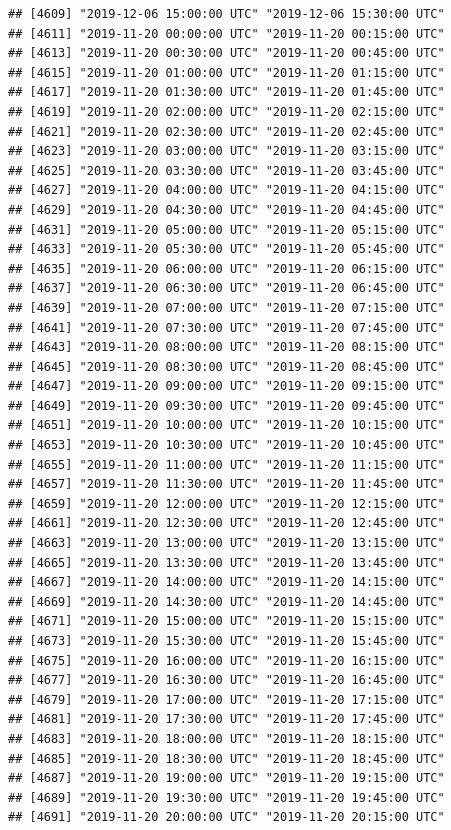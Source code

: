 \documentclass{article}\usepackage[]{graphicx}\usepackage[]{color}
\makeatletter
\newenvironment{kframe}{%
 \def\at@end@of@kframe{}%
 \ifinner\ifhmode%
  \def\at@end@of@kframe{\end{minipage}}%
  \begin{minipage}{\columnwidth}%
 \fi\fi%
 \def\FrameCommand##1{\hskip\@totalleftmargin \hskip-\fboxsep
 \colorbox{shadecolor}{##1}\hskip-\fboxsep
     \hskip-\linewidth \hskip-\@totalleftmargin \hskip\columnwidth}%
 \MakeFramed {\advance\hsize-\width
   \@totalleftmargin\z@ \linewidth\hsize
   \@setminipage}}%
 {\par\unskip\endMakeFramed%
 \at@end@of@kframe}
\newenvironment{knitrout}{}{} %
\makeatother
\begin{document}
\begin{knitrout}
\begin{kframe}
\begin{verbatim}
## [4609] "2019-12-06 15:00:00 UTC" "2019-12-06 15:30:00 UTC"
## [4611] "2019-11-20 00:00:00 UTC" "2019-11-20 00:15:00 UTC"
## [4613] "2019-11-20 00:30:00 UTC" "2019-11-20 00:45:00 UTC"
## [4615] "2019-11-20 01:00:00 UTC" "2019-11-20 01:15:00 UTC"
## [4617] "2019-11-20 01:30:00 UTC" "2019-11-20 01:45:00 UTC"
## [4619] "2019-11-20 02:00:00 UTC" "2019-11-20 02:15:00 UTC"
## [4621] "2019-11-20 02:30:00 UTC" "2019-11-20 02:45:00 UTC"
## [4623] "2019-11-20 03:00:00 UTC" "2019-11-20 03:15:00 UTC"
## [4625] "2019-11-20 03:30:00 UTC" "2019-11-20 03:45:00 UTC"
## [4627] "2019-11-20 04:00:00 UTC" "2019-11-20 04:15:00 UTC"
## [4629] "2019-11-20 04:30:00 UTC" "2019-11-20 04:45:00 UTC"
## [4631] "2019-11-20 05:00:00 UTC" "2019-11-20 05:15:00 UTC"
## [4633] "2019-11-20 05:30:00 UTC" "2019-11-20 05:45:00 UTC"
## [4635] "2019-11-20 06:00:00 UTC" "2019-11-20 06:15:00 UTC"
## [4637] "2019-11-20 06:30:00 UTC" "2019-11-20 06:45:00 UTC"
## [4639] "2019-11-20 07:00:00 UTC" "2019-11-20 07:15:00 UTC"
## [4641] "2019-11-20 07:30:00 UTC" "2019-11-20 07:45:00 UTC"
## [4643] "2019-11-20 08:00:00 UTC" "2019-11-20 08:15:00 UTC"
## [4645] "2019-11-20 08:30:00 UTC" "2019-11-20 08:45:00 UTC"
## [4647] "2019-11-20 09:00:00 UTC" "2019-11-20 09:15:00 UTC"
## [4649] "2019-11-20 09:30:00 UTC" "2019-11-20 09:45:00 UTC"
## [4651] "2019-11-20 10:00:00 UTC" "2019-11-20 10:15:00 UTC"
## [4653] "2019-11-20 10:30:00 UTC" "2019-11-20 10:45:00 UTC"
## [4655] "2019-11-20 11:00:00 UTC" "2019-11-20 11:15:00 UTC"
## [4657] "2019-11-20 11:30:00 UTC" "2019-11-20 11:45:00 UTC"
## [4659] "2019-11-20 12:00:00 UTC" "2019-11-20 12:15:00 UTC"
## [4661] "2019-11-20 12:30:00 UTC" "2019-11-20 12:45:00 UTC"
## [4663] "2019-11-20 13:00:00 UTC" "2019-11-20 13:15:00 UTC"
## [4665] "2019-11-20 13:30:00 UTC" "2019-11-20 13:45:00 UTC"
## [4667] "2019-11-20 14:00:00 UTC" "2019-11-20 14:15:00 UTC"
## [4669] "2019-11-20 14:30:00 UTC" "2019-11-20 14:45:00 UTC"
## [4671] "2019-11-20 15:00:00 UTC" "2019-11-20 15:15:00 UTC"
## [4673] "2019-11-20 15:30:00 UTC" "2019-11-20 15:45:00 UTC"
## [4675] "2019-11-20 16:00:00 UTC" "2019-11-20 16:15:00 UTC"
## [4677] "2019-11-20 16:30:00 UTC" "2019-11-20 16:45:00 UTC"
## [4679] "2019-11-20 17:00:00 UTC" "2019-11-20 17:15:00 UTC"
## [4681] "2019-11-20 17:30:00 UTC" "2019-11-20 17:45:00 UTC"
## [4683] "2019-11-20 18:00:00 UTC" "2019-11-20 18:15:00 UTC"
## [4685] "2019-11-20 18:30:00 UTC" "2019-11-20 18:45:00 UTC"
## [4687] "2019-11-20 19:00:00 UTC" "2019-11-20 19:15:00 UTC"
## [4689] "2019-11-20 19:30:00 UTC" "2019-11-20 19:45:00 UTC"
## [4691] "2019-11-20 20:00:00 UTC" "2019-11-20 20:15:00 UTC"

\end{verbatim}
\end{kframe}
\end{knitrout}
\end{document}
